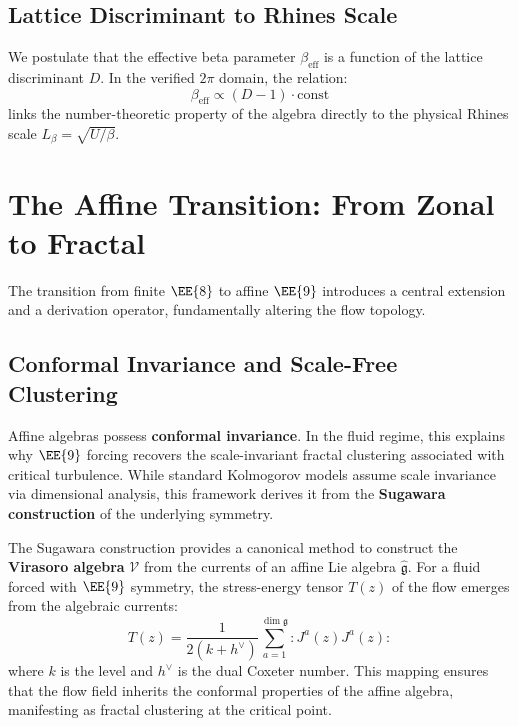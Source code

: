 \subsection{Lattice Discriminant to Rhines Scale}

We postulate that the effective beta parameter $\beta_{\mathrm{eff}}$ is a function of the lattice discriminant $D$. In the verified $2\pi$ domain, the relation:
\begin{equation}
    \beta_{\mathrm{eff}} \propto (D - 1) \cdot \text{const}
\end{equation}
links the number-theoretic property of the algebra directly to the physical Rhines scale $L_\beta = \sqrt{U/\beta}$.

\section{The Affine Transition: From Zonal to Fractal}

The transition from finite $\EE{8}$ to affine $\EE{9}$ introduces a central extension and a derivation operator, fundamentally altering the flow topology.

\subsection{Conformal Invariance and Scale-Free Clustering}

Affine algebras possess \textbf{conformal invariance}. In the fluid regime, this explains why $\EE{9}$ forcing recovers the scale-invariant fractal clustering associated with critical turbulence. While standard Kolmogorov models assume scale invariance via dimensional analysis, this framework derives it from the \textbf{Sugawara construction} of the underlying symmetry.

\begin{theorem}
The Sugawara construction provides a canonical method to construct the \textbf{Virasoro algebra} $\mathcal{V}$ from the currents of an affine Lie algebra $\hat{\mathfrak{g}}$. For a fluid forced with $\EE{9}$ symmetry, the stress-energy tensor $T(z)$ of the flow emerges from the algebraic currents:
\begin{equation}
    T(z) = \frac{1}{2(k + h^\vee)} \sum_{a=1}^{\dim \mathfrak{g}} :J^a(z) J^a(z):
\end{equation}
where $k$ is the level and $h^\vee$ is the dual Coxeter number. This mapping ensures that the flow field inherits the conformal properties of the affine algebra, manifesting as fractal clustering at the critical point.
\end{theorem}

